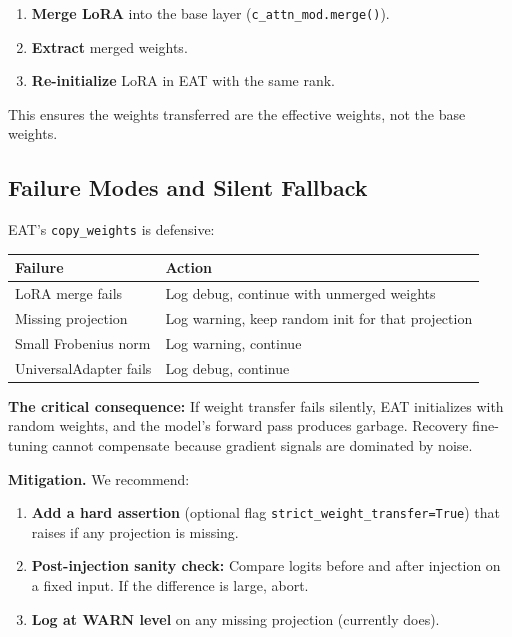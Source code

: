 \begin{enumerate}
\item \textbf{Merge LoRA} into the base layer (\texttt{c\_attn\_mod.merge()}).
\item \textbf{Extract} merged weights.
\item \textbf{Re-initialize} LoRA in EAT with the same rank.

\end{enumerate}
This ensures the weights transferred are the effective weights, not the 
base weights.

\subsection{Failure Modes and Silent Fallback}

EAT's \texttt{copy\_weights} is defensive:

\begin{table}[H]
\centering
\small
\begin{tabular}{ll}
\toprule
\textbf{Failure} & \textbf{Action} \\
\midrule
LoRA merge fails & Log debug, continue with unmerged weights \\
Missing projection & Log warning, keep random init for that projection \\
Small Frobenius norm & Log warning, continue \\
UniversalAdapter fails & Log debug, continue \\
\bottomrule
\end{tabular}
\end{table}

\textbf{The critical consequence:} If weight transfer fails silently, EAT 
initializes with random weights, and the model's forward pass produces 
garbage. Recovery fine-tuning cannot compensate because gradient signals 
are dominated by noise.

\textbf{Mitigation.} We recommend:

\begin{enumerate}
\item \textbf{Add a hard assertion} (optional flag \texttt{strict\_weight\_transfer=True})
  that raises if any projection is missing.
\item \textbf{Post-injection sanity check:} Compare logits before and after
  injection on a fixed input. If the difference is large, abort.
\item \textbf{Log at WARN level} on any missing projection (currently does).

\end{enumerate}
